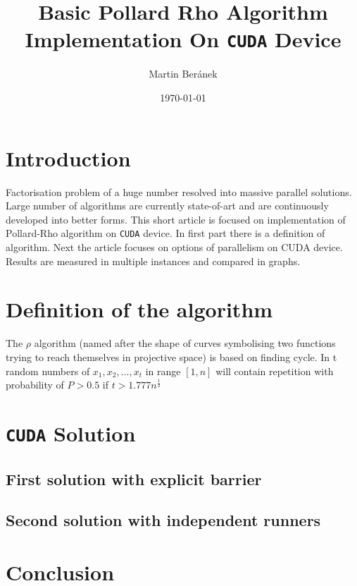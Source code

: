 \documentclass[a4paper]{article}
\begin{document}
\title{Basic Pollard Rho Algorithm Implementation On \texttt{CUDA} Device}
\author{Martin Beránek}
\date{\today}
\maketitle


\section{Introduction}

Factorisation problem of a huge number resolved into massive parallel solutions. Large number of algorithms are currently state-of-art and are continuously developed into better forms. This short article is focused on implementation of Pollard-Rho algorithm on \texttt{CUDA} device. In first part there is a definition of algorithm. Next the article focuses on options of parallelism on CUDA device. Results are measured in multiple instances and compared in graphs. 

\section{Definition of the algorithm}


The $\rho$ algorithm (named after the shape of curves symbolising two functions trying to reach themselves in projective space) is based on finding cycle. In t random numbers of $x_1, x_2, \dots, x_t$ in range $[1, n]$ will contain repetition with probability of $P > 0.5$ if $t > 1.777n^{\frac{1}{2}}$


\section{\texttt{CUDA} Solution}


\subsection{First solution with explicit barrier}


\subsection{Second solution with independent runners}


\section{Conclusion}





\appendix
\end{document}
